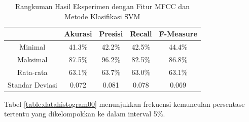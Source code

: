   \begin{table}
    \centering
    \caption{Rangkuman Hasil Eksperimen dengan Fitur MFCC dan Metode Klasifikasi SVM}
    \begin{tabular}{|c|c|c|c|c|}
      \hline
       & Akurasi & Presisi & \f{\f{Recall}} & \f{\f{F-Measure}} \\ \hline
      Minimal         & 41.3\% & 42.2\% & 42.5\% & 44.4\% \\ \hline
      Maksimal        & 87.5\% & 96.2\% & 82.5\% & 86.8\% \\ \hline
      Rata-rata       & 63.1\% & 63.7\% & 63.0\% & 63.1\% \\ \hline
      Standar Deviasi & 0.072  & 0.081  & 0.078  & 0.069  \\ \hline
    \end{tabular}
    \label{table:mfccsvm}
  \end{table}

  Tabel \ref{table:datahistogram00} menunjukkan frekuensi kemunculan persentase tertentu yang dikelompokkan ke dalam interval 5\%.

